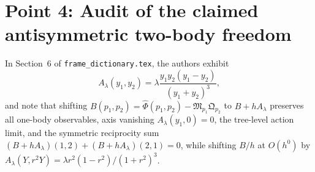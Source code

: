 \documentclass[11pt,a4paper]{article}
\begin{document}
\section{Point 4: Audit of the claimed antisymmetric two-body freedom}

In Section~6 of \texttt{frame\_\allowbreak dictionary.tex}, the authors exhibit
\begin{equation}\label{eq:Alambda_audit}
 A_\lambda(y_1,y_2)=\lambda\frac{y_1y_2(y_1-y_2)}{(y_1+y_2)^3},
\end{equation}
and note that shifting $B(p_1,p_2)=\widehat\Phi(p_1,p_2)-\mathfrak M_{p_1}\mathfrak Q_{p_2}$
to $B+hA_\lambda$ preserves all one-body observables, axis vanishing
$A_\lambda(y_1,0)=0$, the tree-level action limit, and the symmetric reciprocity
sum $(B+hA_\lambda)(1,2)+(B+hA_\lambda)(2,1)=0$, while shifting $B/h$ at $O(h^0)$ by
$A_\lambda(Y,r^2Y)=\lambda r^2(1-r^2)/(1+r^2)^3$.
\end{document}
